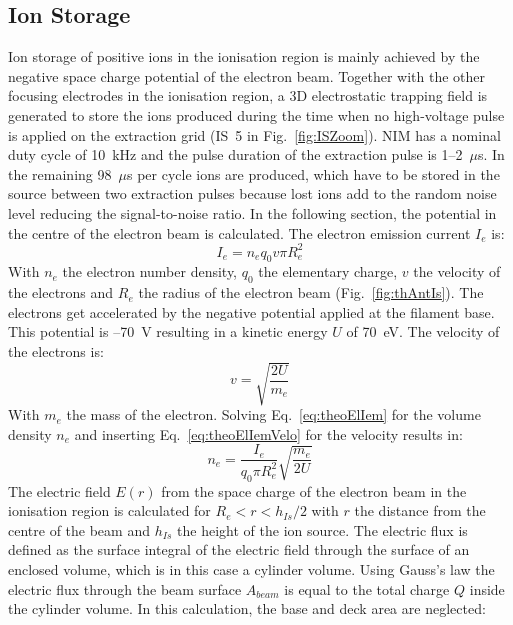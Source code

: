 	\subsection{Ion Storage}\label{chap:TheoIonStor}
	Ion storage of positive ions in the ionisation region is mainly achieved by the negative space charge potential of the electron beam. Together with the other focusing electrodes in the ionisation region, a 3D electrostatic trapping field is generated to store the ions produced during the time when no high-voltage pulse is applied on the extraction grid (IS~5 in Fig.~\ref{fig:ISZoom}). NIM has a nominal duty cycle of 10~kHz and the pulse duration of the extraction pulse is 1--2~$\mu$s. In the remaining 98~$\mu$s per cycle ions are produced, which have to be stored in the source between two extraction pulses because lost ions add to the random noise level reducing the signal-to-noise ratio. In the following section, the potential in the centre of the electron beam is calculated. The electron emission current $I_{e}$ is:
	\begin{equation}
		I_{e} = n_e q_0 v\pi R_e^2
		\label{eq:theoElIem}
	\end{equation}
	With $n_e$ the electron number density, $q_0$ the elementary charge, $v$ the velocity of the electrons and $R_e$ the radius of the electron beam (Fig.~\ref{fig:thAntIs}). The electrons get accelerated by the negative potential applied at the filament base. This potential is --70~\si{\volt} resulting in a kinetic energy $U$ of 70~\si{\electronvolt}. The velocity of the electrons is:
	\begin{equation}
		v = \sqrt{\frac{2 U}{m_e}}
		\label{eq:theoElIemVelo}
	\end{equation}
	With $m_e$ the mass of the electron. Solving Eq.~\eqref{eq:theoElIem} for the volume density $n_e$ and inserting Eq.~\eqref{eq:theoElIemVelo} for the velocity results in:
	\begin{equation}
		n_e = \frac{I_e}{q_0 \pi R_e^2}\sqrt{\frac{m_e}{2U}}
		\label{eq:theoElIemNe}
	\end{equation}
	The electric field $E(r)$ from the space charge of the electron beam in the ionisation region is calculated for $R_e<r<h_{Is}/2$ with $r$ the distance from the centre of the beam and $h_{Is}$ the height of the ion source. The electric flux is defined as the surface integral of the electric field through the surface of an enclosed volume, which is in this case a cylinder volume. Using Gauss's law the electric flux through the beam surface $A_{beam}$ is equal to the total charge $Q$ inside the cylinder volume. In this calculation, the base and deck area are neglected:
